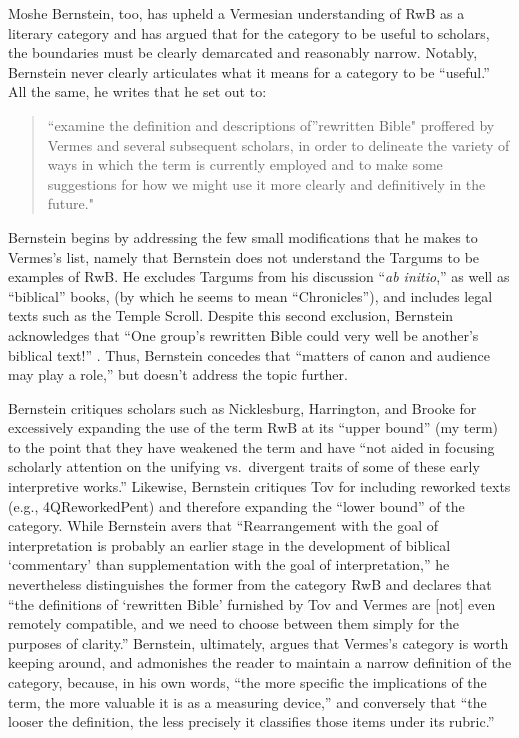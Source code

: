 Moshe Bernstein, too, has upheld a Vermesian understanding of RwB as a
literary category and has argued that for the category to be useful to
scholars, the boundaries must be clearly demarcated and reasonably
narrow.\autocite{bernstein_textus2005} Notably, Bernstein never clearly
articulates what it means for a category to be ``useful.'' All the same,
he writes that he set out to:

\begin{quote}
``examine the definition and descriptions of''rewritten Bible" proffered
by Vermes and several subsequent scholars, in order to delineate the
variety of ways in which the term is currently employed and to make some
suggestions for how we might use it more clearly and definitively in the
future." \autocite[171--172]{bernstein_textus2005}
\end{quote}

Bernstein begins by addressing the few small modifications that he makes
to Vermes's list, namely that Bernstein does not understand the Targums
to be examples of RwB. He excludes Targums from his discussion
``\emph{ab initio},'' as well as ``biblical'' books, (by which he seems
to mean ``Chronicles''), and includes legal texts such as the
Temple Scroll. Despite this second exclusion, Bernstein acknowledges
that ``One group's rewritten Bible could very well be another's biblical
text!'' \autocite[175. This seems particularly odd, since, and Ethiopian
Christian may protest that Jubilees should be excluded as
well.]{bernstein_textus2005}. Thus, Bernstein concedes that ``matters of
canon and audience may play a role,'' but doesn't address the topic
further.

Bernstein critiques scholars such as
Nicklesburg,\autocite{nickelsburg_stone1984}
Harrington,\autocite{harrington_kraft-nickelsburg1986} and
Brooke\autocite{brooke_schiffman-vanderkam2000} for excessively
expanding the use of the term RwB at its ``upper bound'' (my term) to
the point that they have weakened the term and have ``not aided in
focusing scholarly attention on the unifying vs.~divergent traits of
some of these early interpretive
works.''\autocite[179]{bernstein_textus2005} Likewise, Bernstein
critiques Tov for including reworked texts (e.g., 4QReworkedPent) and
therefore expanding the ``lower bound'' of the category. While Bernstein
avers that ``Rearrangement with the goal of interpretation is probably
an earlier stage in the development of biblical `commentary' than
supplementation with the goal of
interpretation,''\autocite[PAGE]{bernstein_textus2005} he nevertheless
distinguishes the former from the category RwB and declares that ``the
definitions of `rewritten Bible' furnished by Tov and Vermes are
{[}not{]} even remotely compatible, and we need to choose between them
simply for the purposes of
clarity.''\autocite[185]{bernstein_textus2005} Bernstein, ultimately,
argues that Vermes's category is worth keeping around, and admonishes
the reader to maintain a narrow definition of the category, because, in
his own words, ``the more specific the implications of the term, the
more valuable it is as a measuring
device,''\autocite[195]{bernstein_textus2005} and conversely that ``the
looser the definition, the less precisely it classifies those items
under its rubric.'' \autocite[195]{bernstein_textus2005}


